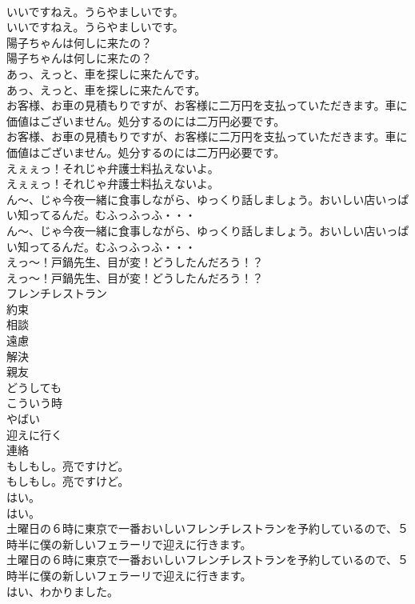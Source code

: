 \documentclass[8pt]{extreport}
\begin{document}
\begin{CJK}{UTF8}{min}
\\	いいですねえ。うらやましいです。	
\\	いいですねえ。うらやましいです。 
\\	陽子ちゃんは何しに来たの？	
\\	陽子ちゃんは何しに来たの？ 
\\	あっ、えっと、車を探しに来たんです。	
\\	あっ、えっと、車を探しに来たんです。 
\\	お客様、お車の見積もりですが、お客様に二万円を支払っていただきます。車に価値はございません。処分するのには二万円必要です。	
\\	お客様、お車の見積もりですが、お客様に二万円を支払っていただきます。車に価値はございません。処分するのには二万円必要です。 
\\	えぇぇっ！それじゃ弁護士料払えないよ。	
\\	えぇぇっ！それじゃ弁護士料払えないよ。 
\\	ん～、じゃ今夜一緒に食事しながら、ゆっくり話しましょう。おいしい店いっぱい知ってるんだ。むふっふっふ・・・	
\\	ん～、じゃ今夜一緒に食事しながら、ゆっくり話しましょう。おいしい店いっぱい知ってるんだ。むふっふっふ・・・ 
\\	えっ～！戸鍋先生、目が変！どうしたんだろう！？	
\\	えっ～！戸鍋先生、目が変！どうしたんだろう！？ 
\\	フレンチレストラン
\\	約束
\\	相談
\\	遠慮
\\	解決
\\	親友
\\	どうしても
\\	こういう時
\\	やばい
\\	迎えに行く
\\	連絡
\\	もしもし。亮ですけど。	
\\	もしもし。亮ですけど。 
\\	はい。	
\\	はい。 
\\	土曜日の６時に東京で一番おいしいフレンチレストランを予約しているので、５時半に僕の新しいフェラーリで迎えに行きます。	
\\	土曜日の６時に東京で一番おいしいフレンチレストランを予約しているので、５時半に僕の新しいフェラーリで迎えに行きます。 
\\	はい、わかりました。	

\end{CJK}
\end{document}
